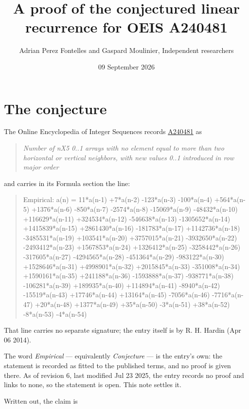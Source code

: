 \documentclass[11pt]{article}
\title{A proof of the conjectured linear recurrence for OEIS A240481}
\author{Adrian Perez Fontelles and Gaspard Moulinier, Independent researchers}
\date{09 September 2026}
\theoremstyle{definition}
\begin{document}
\maketitle
\section{The conjecture}

The Online Encyclopedia of Integer Sequences records \href{https://oeis.org/A240481}{A240481} as

\begin{quote}\itshape Number of nX5 0..1 arrays with no element equal to more than two horizontal or vertical neighbors, with new values 0..1 introduced in row major order\end{quote}

and carries in its Formula section the line:

\begin{quote}\ttfamily Empirical: a(n) = 11*a(n-1) +7*a(n-2) -123*a(n-3) -100*a(n-4) +564*a(n-5) +1376*a(n-6) -850*a(n-7) -2574*a(n-8) -15069*a(n-9) -48432*a(n-10) +116629*a(n-11) +324534*a(n-12) -546638*a(n-13) -1305652*a(n-14) +1415839*a(n-15) +2861430*a(n-16) -181783*a(n-17) +1142736*a(n-18) -3485531*a(n-19) +103541*a(n-20) +3757015*a(n-21) -3932650*a(n-22) -2493412*a(n-23) +1567853*a(n-24) +1326412*a(n-25) -3258442*a(n-26) -317605*a(n-27) -4294565*a(n-28) -451364*a(n-29) -983122*a(n-30) +1528646*a(n-31) +4998901*a(n-32) +2015845*a(n-33) -351008*a(n-34) +1590161*a(n-35) +241188*a(n-36) -1593888*a(n-37) -938771*a(n-38) -106281*a(n-39) +189935*a(n-40) +114894*a(n-41) -8940*a(n-42) -15519*a(n-43) +17746*a(n-44) +13164*a(n-45) -7056*a(n-46) -7716*a(n-47) +20*a(n-48) +1377*a(n-49) +35*a(n-50) -3*a(n-51) +38*a(n-52) -8*a(n-53) -4*a(n-54)\end{quote}

That line carries no separate signature; the entry itself is by R. H. Hardin (Apr 06 2014).

The word {\itshape Empirical} --- equivalently {\itshape Conjecture} --- is the entry's own: the statement is recorded as fitted to the published terms, and no proof is given there. As of revision 6, last modified Jul 23 2025, the entry records no proof and links to none, so the statement is open. This note settles it.

Written out, the claim is
\end{document}
